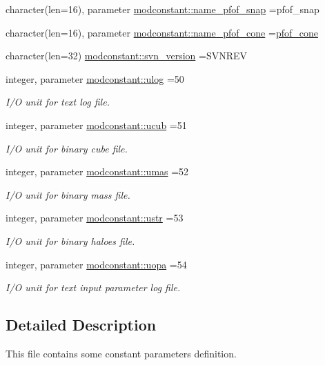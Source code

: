 \begin{DoxyCompactItemize}
character(len=16), parameter \hyperlink{namespacemodconstant_affe7d9379bfee250c843169c7bb10f1c}{modconstant\+::name\+\_\+pfof\+\_\+snap} =\textquotesingle{}pfof\+\_\+snap\textquotesingle{}
\item 
character(len=16), parameter \hyperlink{namespacemodconstant_a7fbb091f14c29c3ca972099325219e3c}{modconstant\+::name\+\_\+pfof\+\_\+cone} =\textquotesingle{}\hyperlink{pfof__cone_8f90_addc770475dc2e497bf70a10ebc158aed}{pfof\+\_\+cone}\textquotesingle{}
\item 
character(len=32) \hyperlink{namespacemodconstant_a56d13db2836a9091e5e89be74deaedd6}{modconstant\+::svn\+\_\+version} =S\+V\+N\+R\+EV
\item 
integer, parameter \hyperlink{namespacemodconstant_a6921eef21b749faf744304003fa3ac63}{modconstant\+::ulog} =50
\begin{DoxyCompactList}\small\item\em I/O unit for text log file. \end{DoxyCompactList}\item 
integer, parameter \hyperlink{namespacemodconstant_acb8d6ab8e571b34dcb11638e425e57db}{modconstant\+::ucub} =51
\begin{DoxyCompactList}\small\item\em I/O unit for binary cube file. \end{DoxyCompactList}\item 
integer, parameter \hyperlink{namespacemodconstant_a542f50ea5e4225b1340cbcbca9eb30ee}{modconstant\+::umas} =52
\begin{DoxyCompactList}\small\item\em I/O unit for binary mass file. \end{DoxyCompactList}\item 
integer, parameter \hyperlink{namespacemodconstant_a7ad4db4111cceef61b48e40126488f2d}{modconstant\+::ustr} =53
\begin{DoxyCompactList}\small\item\em I/O unit for binary haloes file. \end{DoxyCompactList}\item 
integer, parameter \hyperlink{namespacemodconstant_a545e6e3d5c24f9ce81e3f88999f57b41}{modconstant\+::uopa} =54
\begin{DoxyCompactList}\small\item\em I/O unit for text input parameter log file. \end{DoxyCompactList}\end{DoxyCompactItemize}


\subsection{Detailed Description}
This file contains some constant parameters definition. 

